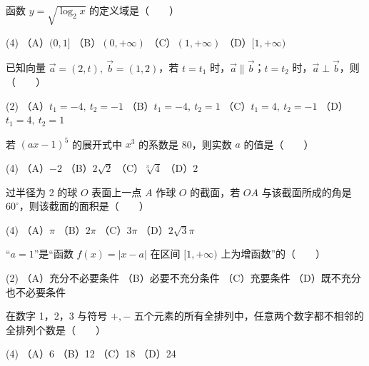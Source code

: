 \begin{question}
函数 $y=\sqrt{\log_2 x}$ 的定义域是\mbox{（　　）}

\begin{gkopts}(4)
\task （A）$(0,1]$
\task （B）$(0,+\infty)$
\task （C）$(1,+\infty)$
\task （D）$[1,+\infty)$
\end{gkopts}

\end{question}
\begin{question}
已知向量 $\vec a=(2,t),\ \vec b=(1,2)$，若 $t=t_1$ 时，$\vec a\parallel\vec b$；$t=t_2$ 时，$\vec a\perp\vec b$，则\mbox{（　　）}

\begin{gkopts}(2)
\task （A）$t_1=-4,\ t_2=-1$
\task （B）$t_1=-4,\ t_2=1$
\task （C）$t_1=4,\ t_2=-1$
\task （D）$t_1=4,\ t_2=1$
\end{gkopts}

\end{question}
\begin{question}
若 $(ax-1)^5$ 的展开式中 $x^3$ 的系数是 80，则实数 $a$ 的值是\mbox{（　　）}

\begin{gkopts}(4)
\task （A）$-2$
\task （B）$2\sqrt2$
\task （C）$\sqrt[3]{4}$
\task （D）$2$
\end{gkopts}

\end{question}
\begin{question}
过半径为 2 的球 $O$ 表面上一点 $A$ 作球 $O$ 的截面，若 $OA$ 与该截面所成的角是 $60^\circ$，则该截面的面积是\mbox{（　　）}

\begin{gkopts}(4)
\task （A）$\pi$
\task （B）$2\pi$
\task （C）$3\pi$
\task （D）$2\sqrt3\pi$
\end{gkopts}

\end{question}
\begin{question}
“$a=1$”是“函数 $f(x)=|x-a|$ 在区间 $[1,+\infty)$ 上为增函数”的\mbox{（　　）}

\begin{gkopts}(2)
\task （A）充分不必要条件
\task （B）必要不充分条件
\task （C）充要条件
\task （D）既不充分也不必要条件
\end{gkopts}

\end{question}
\begin{question}
在数字 1，2，3 与符号 $+,-$ 五个元素的所有全排列中，任意两个数字都不相邻的全排列个数是\mbox{（　　）}

\begin{gkopts}(4)
\task （A）6
\task （B）12
\task （C）18
\task （D）24
\end{gkopts}

\end{question}
